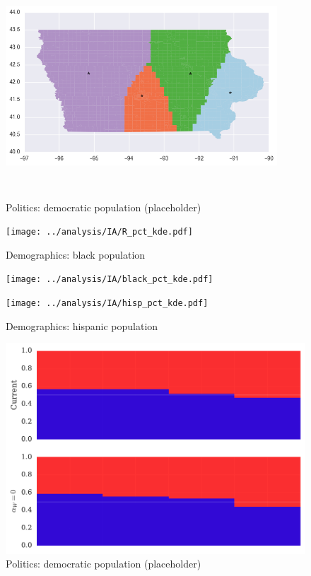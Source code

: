 \begin{figure}[htb!]
\includegraphics[width=4in,height=3in,keepaspectratio]{../maps/IA/static/0_25_after.png}
\end{figure}

\clearpage
\newpage

\begin{figure}[htb!] \centering
\caption{ Politics: democratic population (placeholder)}
\texttt{[image: ../analysis/IA/R\_pct\_kde.pdf]}
\caption{ Demographics: black population }
\texttt{[image: ../analysis/IA/black\_pct\_kde.pdf]}
\caption{ Demographics: hispanic population }
\texttt{[image: ../analysis/IA/hisp\_pct\_kde.pdf]}
\end{figure}

\clearpage
\newpage

\begin{figure}[htb!] \centering
\caption{ Politics: democratic population (placeholder)}
\includegraphics[width=6in]{../analysis/IA/barplot.pdf}
\end{figure}

